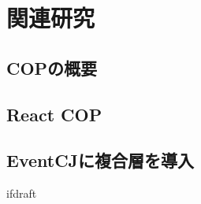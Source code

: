 \documentclass{jsarticle}
\begin{document}
    \fi
    \section{関連研究}
    \subsection{COPの概要}

    \subsection{React COP}

    \subsection{EventCJに複合層を導入}



    \expandafter\ifx\csname ifdraft\endcsname\relax
\end{document}

